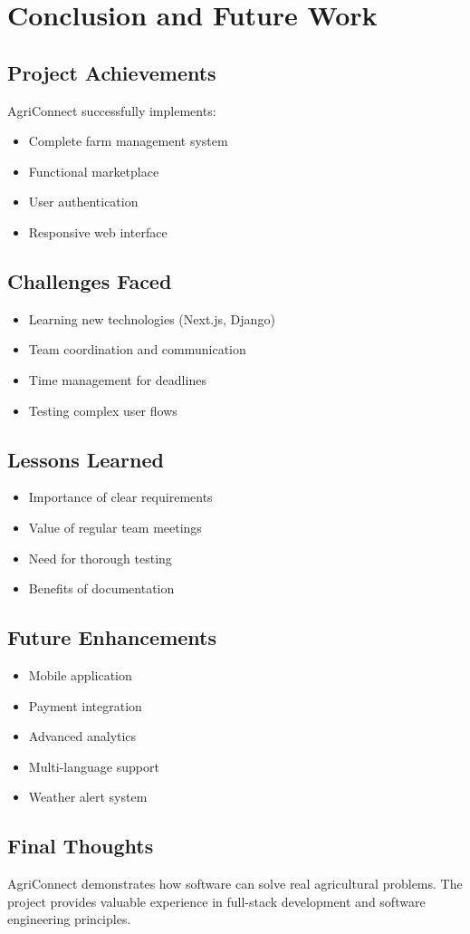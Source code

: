 \section{Conclusion and Future Work}

\subsection{Project Achievements}
AgriConnect successfully implements:
\begin{itemize}[leftmargin=*]
	\item Complete farm management system
	\item Functional marketplace
	\item User authentication
	\item Responsive web interface
\end{itemize}

\subsection{Challenges Faced}
\begin{itemize}[leftmargin=*]
	\item Learning new technologies (Next.js, Django)
	\item Team coordination and communication
	\item Time management for deadlines
	\item Testing complex user flows
\end{itemize}

\subsection{Lessons Learned}
\begin{itemize}[leftmargin=*]
	\item Importance of clear requirements
	\item Value of regular team meetings
	\item Need for thorough testing
	\item Benefits of documentation
\end{itemize}

\subsection{Future Enhancements}
\begin{itemize}[leftmargin=*]
	\item Mobile application
	\item Payment integration
	\item Advanced analytics
	\item Multi-language support
	\item Weather alert system
\end{itemize}

\subsection{Final Thoughts}
AgriConnect demonstrates how software can solve real agricultural problems. The project provides valuable experience in full-stack development and software engineering principles.
